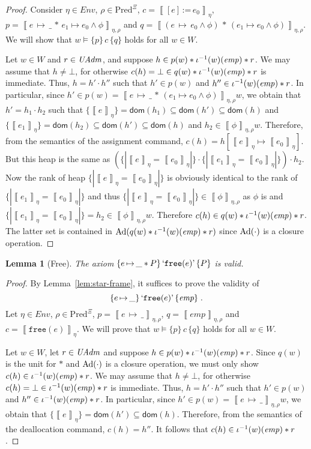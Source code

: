 \documentclass{LMCS}
\newtheorem{lemma}[theorem]{Lemma}
\theoremstyle{remark}
\newcommand{\ALMOSTPURE}{\text{pseudo pure}\xspace}
\newcommand{\QUOTE}[1]{\textnormal{`\ensuremath{#1}'}}
\newcommand{\SYN}[1]{\ensuremath{\texttt{#1}}}
\newcommand{\record}[1]{\ensuremath{\left.\!\{\!|{#1}|\!\}\right.\!}}
\newcommand{\dom}[1]{\ensuremath{\mathsf{dom}({#1})}}
\newcommand{\COMB}{\ensuremath{\cdot}}
\newcommand{\Env}{\ensuremath{\textit{Env}}\xspace}
\newcommand{\triple}[3]{{\ensuremath{\!\left.\{ #1 \}\, #2\, \{  #3 \}\!\right.}}}
\newcommand{\EMP}{\ensuremath{\textit{emp}}}
\newcommand{\wemp}{\textnormal{\textit{emp}}}
\newcommand{\den}[1]{\left\llbracket #1
  \right\rrbracket}
\newcommand{\Pred}{\ensuremath{\mathrm{Pred}}\xspace}
\newcommand{\W}{\ensuremath{W}}
\newcommand{\UNFOLD}{\ensuremath{\iota^{-1}}}
\newcommand{\X}{\ensuremath{\Xi}}
\begin{document}
\begin{proof} 
Consider  $\eta\in\Env$, $\rho\in\Pred^\X$, $c = \den{[e] \,\SYN{:=}\,
  e_0}_\eta$, $p = \den{e\,{\mapsto}\,\_
  \,{*}\,e_1{\mapsto}e_0 \wedge \phi}_{\eta,\rho}$ and $q =
\den{(e\,{\mapsto}\,e_0\wedge \phi) \,{*}\, (e_1{\mapsto}e_0 \wedge
  \phi)}_{\eta,\rho}$.  We
will show that $w\models\triple{p}{c}{q}$ holds for all $w\in\W$.

Let $w\in\W$ and $r\in\mathit{UAdm}$, and suppose $h\in p(w) * \UNFOLD(w)(\wemp) * r$. 
We may assume that $h\neq\bot$, for otherwise $c(h) = \bot\in q(w) * \UNFOLD(w)(\wemp) * r$ is immediate. 
Thus, $h = h'\COMB h''$ such that $h'\in p(w)$ and $h''\in \UNFOLD(w)(\wemp) * r$. 
In particular, since $h'\in p(w) = \den {e\,{\mapsto}\,\_ \,{*}\, (e_1{\mapsto}e_0 \wedge \phi)}_{\eta,\rho} w$, we obtain that
$h' = h_1\COMB h_2$ such that 
 $\{\den{e}_\eta \}= \dom{h_1}\subseteq\dom{h'}\subseteq\dom{h}$ and 
 $\{\den{e_1}_\eta\} =\dom{h_2}\subseteq\dom{h'}\subseteq\dom{h}$ and
 $h_2\in \den{\phi}_{\eta,\rho} w$.
Therefore, from the semantics of the assignment command,  
$c(h) = h[\den{e}_\eta\mapsto\den{e_0}_\eta]$. 
But this heap is the same as $(\record{\den{e}_\eta = \den{e_0}_\eta}\COMB \record{\den{e_1}_\eta = \den{e_0}_\eta})  \COMB h_2$.
Now the rank of heap $\record{\den{e}_\eta = \den{e_0}_\eta}$ is obviously identical to the rank of
$ \record{\den{e_1}_\eta = \den{e_0}_\eta}$ and thus $\record{\den{e}_\eta = \den{e_0}_\eta} \in \den{\phi}_{\eta,\rho}$ as $\phi$ is \ALMOSTPURE and $ \record{\den{e_1}_\eta = \den{e_0}_\eta} = h_2\in  \den{\phi}_{\eta,\rho} w$.
Therefore $c(h) \in q(w) * \UNFOLD(w)(\wemp) * r $. The latter set is contained in $\DCl(q(w) * \UNFOLD(w)(\wemp) * r)$ since $\mathrm{Ad}(\cdot)$ is a closure operation.
\end{proof}





\begin{lemma}[Free] 
The axiom $\triple{e\,{\mapsto}\,\_ * P}{\QUOTE{\SYN{free}(e)}}{P}$ is valid. 
\end{lemma}

\begin{proof}
By Lemma~\ref{lem:star-frame}, it suffices to prove the validity of
\[
\triple{e\,{\mapsto}\,\_}{\QUOTE{\SYN{free}(e)}}{\EMP}\ .
\]
Let $\eta\in\Env$, $\rho\in\Pred^\X$, $p = \den{e\,{\mapsto}\,\_}_{\eta,\rho}$, $q = \den{\EMP}_{\eta,\rho}$ and $c = \den{\SYN{free}(e)}_\eta$. 
We will prove that $w\models\triple{p}{c}{q}$ holds for all $w\in\W$. 

Let $w\in\W$, let $r\in\mathit{UAdm}$ and suppose $h\in p(w) * \UNFOLD(w)(\wemp) * r$. 
Since $q(w)$ is the unit for $*$ and $\mathrm{Ad}(\cdot)$ is a closure operation, we must only show $c(h)\in\UNFOLD(w)(\wemp) * r$. 
We may assume that $h\neq\bot$, for otherwise $c(h) = \bot\in \UNFOLD(w)(\wemp) * r$ is immediate. 
Thus, $h = h'\COMB h''$ such that $h'\in p(w)$ and $h''\in \UNFOLD(w)(\wemp) * r$. 
In particular, since $h'\in p(w) = \den{e\,{\mapsto}\,\_}_{\eta,\rho} w$, we obtain that $\{\den{e}_\eta\} = \dom{h'}\subseteq\dom{h}$. 
Therefore, from the semantics of the deallocation command, 
$c(h) = h''$. It follows that $c(h)\in\UNFOLD(w)(\wemp) * r$. 
\end{proof}
\end{document}
